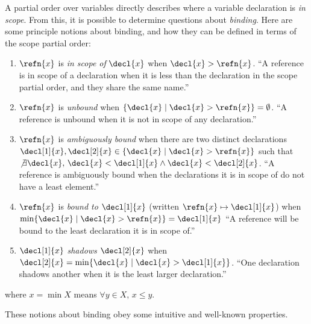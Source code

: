 \documentclass[preprint]{sigplanconf}
\theoremstyle{plain}
\newcommand{\bound}{\mapsto}
\newcommand{\NotExists}[1]{\not\exists{#1},\,}
\newcommand{\Forall}[1]{\forall{#1},\,}
\newcommand{\mand}{\wedge}
\begin{document}
A partial order over variables directly describes where a variable
declaration is \emph{in scope}. From this, it is possible to determine
questions about \emph{binding}. Here are some principle notions about
binding, and how they can be defined in terms of the scope partial
order:
\begin{enumerate}
\item $\refn{x}$ is \emph{in scope of} $\decl{x}$ when $\decl{x} >
  \refn{x}$.
``A reference is in scope of a declaration when it is less than the
  declaration in the scope partial order, and they share the same name.''
\item $\refn{x}$ is \emph{unbound} when
$\{\decl{x} \mid \decl{x} > \refn{x}\} = \emptyset$.
``A reference is unbound when it is not in scope of any declaration.''
\item $\refn{x}$ is \emph{ambiguously bound} when there are two
distinct declarations
$\decl[1]{x}, \decl[2]{x} \in \{\decl{x} \mid \decl{x} > \refn{x}\}$
such that $\NotExists{\decl{x}}
  \decl{x} < \decl[1]{x} \mand \decl{x} < \decl[2]{x}$.
``A reference is ambiguously bound when the declarations it is in
  scope of do not have a least element.''
\item $\refn{x}$ is \emph{bound to} $\decl[1]{x}$
(written $\refn{x} \bound \decl[1]{x}$)
when $\min \{\decl{x} \mid \decl{x} > \refn{x}\} = \decl[1]{x}$
``A reference will be bound to the least declaration it is in scope of.''
\item $\decl[1]{x}$ \emph{shadows} $\decl[2]{x}$ when
$\decl[2]{x} = \min \{\decl{x} \mid \decl{x} > \decl[1]{x}\}$.
``One declaration shadows another when it is the least larger
  declaration.''
\end{enumerate}
where $x = \min X$ means $\Forall{y \in X} x \leq y$.

These notions about binding obey some intuitive and well-known
properties.
\end{document}
